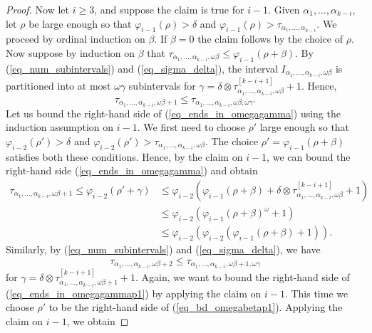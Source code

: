 \documentclass{article}
\theoremstyle{definition}
\begin{document}
\begin{proof}
    Now let $i\ge 3$, and suppose the claim is true for $i-1$. Given $\alpha_1,\ldots,\alpha_{k-i}$, let $\rho$ be large enough so that $\varphi_{i-1}(\rho)>\delta$ and $\varphi_{i-1}(\rho)>\tau_{\alpha_1,\ldots,\alpha_{k-i}}$. We proceed by ordinal induction on $\beta$. If $\beta=0$ the claim follows by the choice of $\rho$. Now suppose by induction on $\beta$ that $\tau_{\alpha_1,\ldots,\alpha_{k-i},\omega\beta}\le\varphi_{i-1}(\rho+\beta)$. By (\ref{eq_num_subintervals}) and (\ref{eq_sigma_delta}), the interval $I_{\alpha_1,\ldots,\alpha_{k-i},\omega\beta}$ is partitioned into at most $\omega\gamma$ subintervals for $\gamma=\delta\otimes\tau_{\alpha_1,\ldots,\alpha_{k-i},\omega\beta}^{[k-i+1]}+1$. Hence,
    \begin{equation}\label{eq_ends_in_omegagamma}
        \tau_{\alpha_1,\ldots,\alpha_{k-i},\omega\beta+1}\le\tau_{\alpha_1,\ldots,\alpha_{k-i},\omega\beta,\omega\gamma}.
    \end{equation}
    Let us bound the right-hand side of (\ref{eq_ends_in_omegagamma}) using the induction assumption on $i-1$. We first need to choose $\rho'$ large enough so that $\varphi_{i-2}(\rho')>\delta$ and $\varphi_{i-2}(\rho')>\tau_{\alpha_1,\ldots,\alpha_{k-i},\omega\beta}$. The choice $\rho'=\varphi_{i-1}(\rho+\beta)$ satisfies both these conditions. Hence, by the claim on $i-1$, we can bound the right-hand side (\ref{eq_ends_in_omegagamma}) and obtain
    \begin{align}
        \tau_{\alpha_1,\ldots,\alpha_{k-i},\omega\beta+1}\le\varphi_{i-2}(\rho'+\gamma)&\le\varphi_{i-2}(\varphi_{i-1}(\rho+\beta)+\delta\otimes\tau_{\alpha_1,\ldots,\alpha_{k-i},\omega\beta}^{[k-i+1]}+1)\nonumber\\&\le\varphi_{i-2}(\varphi_{i-1}(\rho+\beta)^\omega+1)\nonumber\\&\le\varphi_{i-2}(\varphi_{i-2}(\varphi_{i-1}(\rho+\beta)+1)).\label{eq_bd_omegabetap1}
    \end{align}
    Similarly, by (\ref{eq_num_subintervals}) and (\ref{eq_sigma_delta}), we have
    \begin{equation}\label{eq_ends_in_omegagammap1}
    \tau_{\alpha_1,\ldots,\alpha_{k-i},\omega\beta+2}\le\tau_{\alpha_1,\ldots,\alpha_{k-i},\omega\beta+1,\omega\gamma}
    \end{equation}
    for $\gamma=\delta\otimes\tau_{\alpha_1,\ldots,\alpha_{k-i},\omega\beta+1}^{[k-i+1]}+1$. Again, we want to bound the right-hand side of (\ref{eq_ends_in_omegagammap1}) by applying the claim on $i-1$. This time we choose $\rho'$ to be the right-hand side of (\ref{eq_bd_omegabetap1}). Applying the claim on $i-1$, we obtain

\end{proof}
\end{document}
